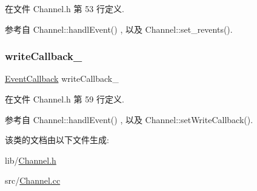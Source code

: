 在文件 Channel.\+h 第 53 行定义.



参考自 Channel\+::handl\+Event() , 以及 Channel\+::set\+\_\+revents().

\mbox{\label{classmuduo_1_1Channel_a1d5ee91b83f4499ea0a52c5491113169}} 
\subsubsection{\texorpdfstring{write\+Callback\+\_\+}{writeCallback\_}}
{\footnotesize\ttfamily \hyperlink{classmuduo_1_1Channel_aba4530f63bcce7091a51e66d01f4d2cb}{Event\+Callback} write\+Callback\+\_\+\hspace{0.3cm}{\ttfamily [private]}}



在文件 Channel.\+h 第 59 行定义.



参考自 Channel\+::handl\+Event() , 以及 Channel\+::set\+Write\+Callback().



该类的文档由以下文件生成\+:\begin{DoxyCompactItemize}
\item 
lib/\hyperlink{Channel_8h}{Channel.\+h}\item 
src/\hyperlink{Channel_8cc}{Channel.\+cc}\end{DoxyCompactItemize}
